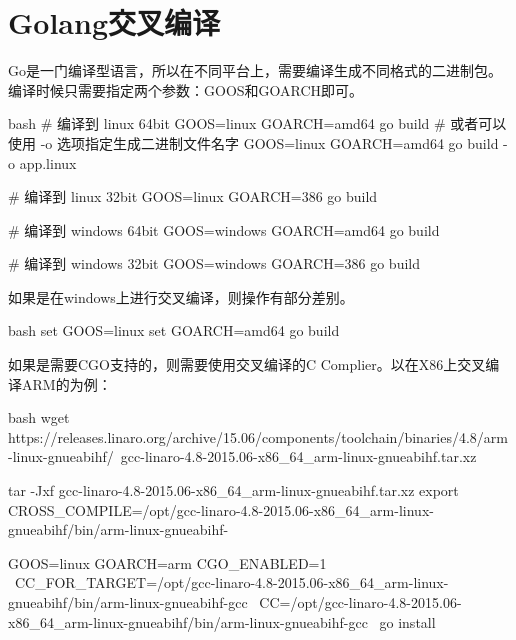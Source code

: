 \section{Golang交叉编译}
Go是一门编译型语言，所以在不同平台上，需要编译生成不同格式的二进制包。
编译时候只需要指定两个参数：GOOS和GOARCH即可。
\begin{code-block}{bash}
# 编译到 linux 64bit
GOOS=linux GOARCH=amd64 go build
# 或者可以使用 -o 选项指定生成二进制文件名字
GOOS=linux GOARCH=amd64 go build -o app.linux

# 编译到 linux 32bit
GOOS=linux GOARCH=386 go build

# 编译到 windows 64bit
GOOS=windows GOARCH=amd64 go build

# 编译到 windows 32bit
GOOS=windows GOARCH=386 go build
\end{code-block}

如果是在windows上进行交叉编译，则操作有部分差别。
\begin{code-block}{bash}
set GOOS=linux
set GOARCH=amd64
go build
\end{code-block}

如果是需要CGO支持的，则需要使用交叉编译的C Complier。以在X86上交叉编译ARM的为例：
\begin{code-block}{bash}
wget https://releases.linaro.org/archive/15.06/components/toolchain/binaries/4.8/arm-linux-gnueabihf/\
gcc-linaro-4.8-2015.06-x86_64_arm-linux-gnueabihf.tar.xz

tar -Jxf gcc-linaro-4.8-2015.06-x86_64_arm-linux-gnueabihf.tar.xz
export CROSS_COMPILE=/opt/gcc-linaro-4.8-2015.06-x86_64_arm-linux-gnueabihf/bin/arm-linux-gnueabihf-

GOOS=linux GOARCH=arm CGO_ENABLED=1 \
    CC_FOR_TARGET=/opt/gcc-linaro-4.8-2015.06-x86_64_arm-linux-gnueabihf/bin/arm-linux-gnueabihf-gcc \
    CC=/opt/gcc-linaro-4.8-2015.06-x86_64_arm-linux-gnueabihf/bin/arm-linux-gnueabihf-gcc \
    go install

\end{code-block}


